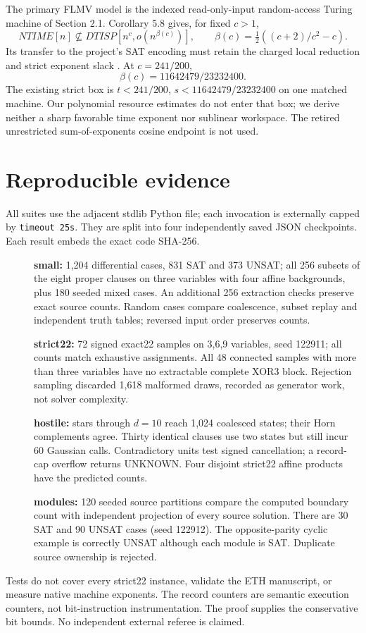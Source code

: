 \documentclass[11pt]{article}
\begin{document}
The primary FLMV model is the indexed read-only-input random-access Turing
machine of Section 2.1. Corollary 5.8 gives, for fixed $c>1$,
\[
 NTIME[n]\not\subseteq DTISP[n^c,o(n^{\beta(c)})],\qquad
 \beta(c)=\tfrac12((c+2)/c^2-c).
\]
Its transfer to the project's SAT encoding must retain the charged local
reduction and strict exponent slack \cite{flmv}. At $c=241/200$,
\[
 \beta(c)=11642479/23232400.
\]
The existing strict box is $t<241/200$, $s<11642479/23232400$ on one
matched machine. Our polynomial resource estimates do not enter that box;
we derive neither a sharp favorable time exponent nor sublinear workspace.
The retired unrestricted sum-of-exponents cosine endpoint is not used.

\section{Reproducible evidence}
All suites use the adjacent stdlib Python file; each invocation is externally
capped by \texttt{timeout 25s}. They are split into four independently saved
JSON checkpoints. Each result embeds the exact code SHA-256.
\begin{description}
\item[] \textbf{small:} 1,204 differential cases, 831 SAT and 373 UNSAT;
all 256 subsets of the eight proper clauses on three variables with four
affine backgrounds, plus 180 seeded mixed cases. An additional 256 extraction
checks preserve exact source counts. Random cases compare coalescence,
subset replay and independent truth tables; reversed input order preserves counts.
\item[] \textbf{strict22:} 72 signed exact22 samples on 3,6,9 variables,
seed 122911; all counts match exhaustive assignments. All 48 connected
samples with more than three variables have no extractable complete XOR3
block. Rejection sampling discarded 1,618 malformed draws, recorded as
generator work, not solver complexity.
\item[] \textbf{hostile:} stars through $d=10$ reach 1,024 coalesced states;
their Horn complements agree. Thirty identical clauses use two states but
still incur 60 Gaussian calls. Contradictory units test signed cancellation;
a record-cap overflow returns UNKNOWN. Four disjoint strict22 affine
products have the predicted counts.
\item[] \textbf{modules:} 120 seeded source partitions compare the computed
boundary count with independent projection of every source solution.
There are 30 SAT and 90 UNSAT cases (seed 122912).
The opposite-parity cyclic example is correctly UNSAT although each module
is SAT. Duplicate source ownership is rejected.
\end{description}
Tests do not cover every strict22 instance, validate the ETH manuscript, or
measure native machine exponents. The record counters are semantic execution
counters, not bit-instruction instrumentation. The proof supplies the
conservative bit bounds. No independent external referee is claimed.
\end{document}
